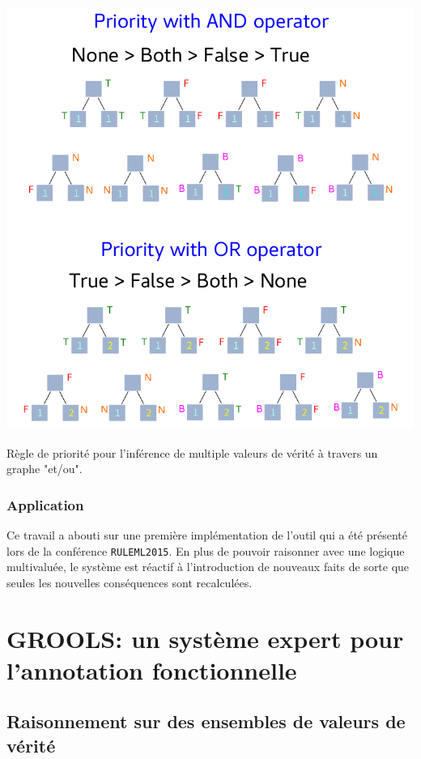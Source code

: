 \begin{refsegment}
\begin{shadedfigure}[H]
    \centering
    \includegraphics[width=\textwidth]{img/four_values_priorities_rules.pdf}
    \caption{ Règle de priorité pour l'inférence de multiple valeurs de vérité à travers un graphe "et/ou". }
    \label{fig:four_truth_values}
\end{shadedfigure}


\subsection{Application}
Ce travail a abouti sur une première implémentation de l'outil qui a été présenté lors de la conférence \texttt{RULEML2015}. En plus de pouvoir raisonner avec une logique multivaluée, le système est réactif à l'introduction de nouveaux faits de sorte que seules les nouvelles conséquences sont recalculées.



\chapter{GROOLS: un système expert pour l'annotation fonctionnelle}

\section{Raisonnement sur des ensembles de valeurs de vérité}


\end{refsegment}
